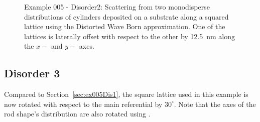 \begin{figure}[H]
\hfill
{}
\hfill
{}
\hfill
\caption{Example 005 - Disorder2: Scattering from two monodisperse distributions of cylinders deposited on a substrate along a squared lattice using the Distorted Wave Born approximation. One of the lattices is laterally offset with respect to the other by 12.5~nm along the $x-$ and $y-$ axes.}
\label{fig:PythonEx5Dis2} 
\end{figure}

\subsection{Disorder 3}
Compared to Section~\ref{sec:ex005Dis1}, the square lattice used in this example is now rotated with respect to the main referential by $30^{\circ}$. Note that the axes of the rod shape's distribution are also rotated using .



